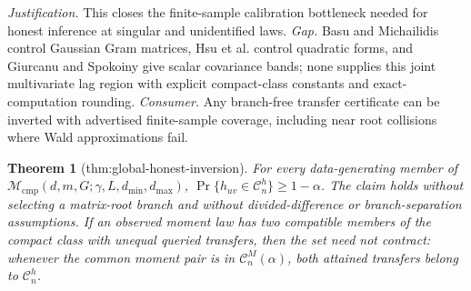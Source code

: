 \documentclass{article}
\newtheorem{theorem}{Theorem}
\begin{document}
\par\smallskip\noindent \textit{Justification.} This closes the finite-sample calibration bottleneck needed for honest inference at singular and unidentified laws. \textit{Gap.} Basu and Michailidis control Gaussian Gram matrices, Hsu et al. control quadratic forms, and Giurcanu and Spokoiny give scalar covariance bands; none supplies this joint multivariate lag region with explicit compact-class constants and exact-computation rounding. \textit{Consumer.} Any branch-free transfer certificate can be inverted with advertised finite-sample coverage, including near root collisions where Wald approximations fail.

\begin{theorem}[thm:global-honest-inversion]\label{thm:global-honest-inversion}
For every data-generating member of
\(\mathcal M_{\mathrm{cmp}}(d,m,G;\gamma,L,d_{\min},d_{\max})\),
\(\Pr\{h_{uv}\in\mathcal C_n^h\}\ge1-\alpha\). The claim holds without
selecting a matrix-root branch and without divided-difference or
branch-separation assumptions. If an observed moment law has two compatible
members of the compact class with unequal queried transfers, then the set
need not contract: whenever the common moment pair is in
\(\mathcal C_n^M(\alpha)\), both attained transfers belong to
\(\mathcal C_n^h\).
\end{theorem}
\end{document}
